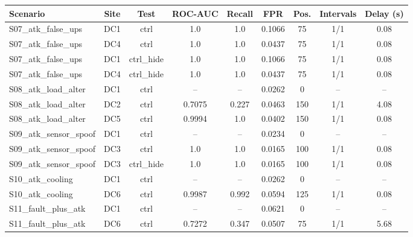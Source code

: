 \begin{tabular}{lcccccccc}
\hline
Scenario & Site & Test & ROC-AUC & Recall & FPR & Pos. & Intervals & Delay (s) \\
\hline
S07\_atk\_false\_ups & DC1 & ctrl & 1.0 & 1.0 & 0.1066 & 75 & 1/1 & 0.08 \\
S07\_atk\_false\_ups & DC4 & ctrl & 1.0 & 1.0 & 0.0437 & 75 & 1/1 & 0.08 \\
S07\_atk\_false\_ups & DC1 & ctrl\_hide & 1.0 & 1.0 & 0.1066 & 75 & 1/1 & 0.08 \\
S07\_atk\_false\_ups & DC4 & ctrl\_hide & 1.0 & 1.0 & 0.0437 & 75 & 1/1 & 0.08 \\
S08\_atk\_load\_alter & DC1 & ctrl & -- & -- & 0.0262 & 0 & -- & -- \\
S08\_atk\_load\_alter & DC2 & ctrl & 0.7075 & 0.227 & 0.0463 & 150 & 1/1 & 4.08 \\
S08\_atk\_load\_alter & DC5 & ctrl & 0.9994 & 1.0 & 0.0402 & 150 & 1/1 & 0.08 \\
S09\_atk\_sensor\_spoof & DC1 & ctrl & -- & -- & 0.0234 & 0 & -- & -- \\
S09\_atk\_sensor\_spoof & DC3 & ctrl & 1.0 & 1.0 & 0.0165 & 100 & 1/1 & 0.08 \\
S09\_atk\_sensor\_spoof & DC3 & ctrl\_hide & 1.0 & 1.0 & 0.0165 & 100 & 1/1 & 0.08 \\
S10\_atk\_cooling & DC1 & ctrl & -- & -- & 0.0262 & 0 & -- & -- \\
S10\_atk\_cooling & DC6 & ctrl & 0.9987 & 0.992 & 0.0594 & 125 & 1/1 & 0.08 \\
S11\_fault\_plus\_atk & DC1 & ctrl & -- & -- & 0.0621 & 0 & -- & -- \\
S11\_fault\_plus\_atk & DC6 & ctrl & 0.7272 & 0.347 & 0.0507 & 75 & 1/1 & 5.68 \\
\hline
\end{tabular}
